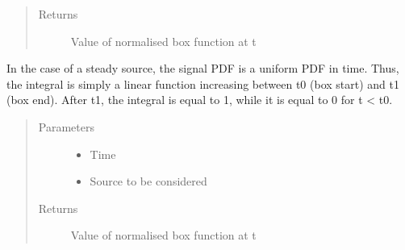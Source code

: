 \documentclass[letterpaper,10pt,english]{sphinxmanual}
\begin{document}
\begin{fulllineitems}
\begin{fulllineitems}
\begin{quote}
\begin{description}
\item[{Returns}] \leavevmode
Value of normalised box function at t

\end{description}\end{quote}

\end{fulllineitems}


\begin{fulllineitems}
\label{\detokenize{index:flarestack.core.time_pdf.Steady.signal_integral}}
In the case of a steady source, the signal PDF is a uniform PDF in
time. Thus, the integral is simply a linear function increasing
between t0 (box start) and t1 (box end). After t1, the integral is
equal to 1, while it is equal to 0 for t \textless{} t0.
\begin{quote}\begin{description}
\item[{Parameters}] \leavevmode\begin{itemize}
\item {} 
 \textendash{} Time

\item {} 
 \textendash{} Source to be considered

\end{itemize}

\item[{Returns}] \leavevmode
Value of normalised box function at t

\end{description}\end{quote}

\end{fulllineitems}


\end{fulllineitems}

\end{document}
